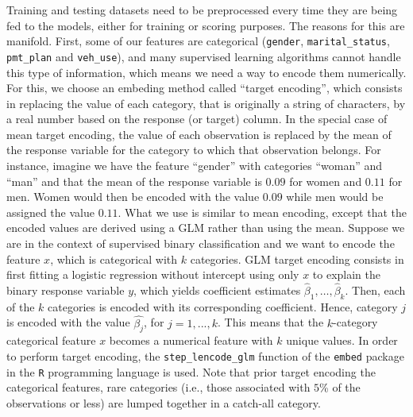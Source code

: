 \documentclass{article}
\begin{document}
Training and testing datasets need to be preprocessed every time they are being fed to the models, either for training or scoring purposes. The reasons for this are manifold. First, some of our features are categorical (\texttt{gender}, \texttt{marital\_status}, \texttt{pmt\_plan} and \texttt{veh\_use}), and many supervised learning algorithms cannot handle this type of information, which means we need a way to encode them numerically. For this, we choose an embeding method called ``target encoding'', which consists in replacing the value of each category, that is originally a string of characters, by a real number based on the response (or target) column. In the special case of mean target encoding, the value of each observation is replaced by the mean of the response variable for the category to which that observation belongs. For instance, imagine we have the feature ``gender'' with categories ``woman'' and ``man'' and that the mean of the response variable is $0.09$ for women and $0.11$ for men. Women would then be encoded with the value $0.09$ while men would be assigned the value $0.11$. What we use is similar to mean encoding, except that the encoded values are derived using a GLM rather than using the mean. Suppose we are in the context of supervised binary classification and we want to encode the feature $x$, which is categorical with $k$ categories. GLM target encoding consists in first fitting a logistic regression without intercept using only $x$ to explain the binary response variable $y$, which yields coefficient estimates $\widehat{\beta}_1, \dots, \widehat{\beta}_k$. Then, each of the $k$ categories is encoded with its corresponding coefficient. Hence, category $j$ is encoded with the value $\widehat{\beta_j}$, for $j = 1, ..., k$. This means that the $k$-category categorical feature $x$ becomes a numerical feature with $k$ unique values. In order to perform target encoding, the \texttt{step\_lencode\_glm} function of the \texttt{embed} package in the \texttt{R} programming language is used. Note that prior target encoding the categorical features, rare categories (i.e., those associated with $5$\% of the observations or less) are lumped together in a catch-all category. 
\end{document}
